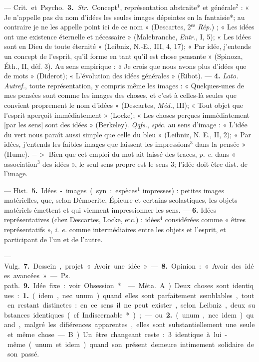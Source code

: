 \begin{itemize}[leftmargin=1cm, label=, itemsep=1pt]
— \si{Crit.} et \si{Psycho.} {\bf 3.} {\it Str.} Concept$^1$, représentation abstraite* et
générale$^2$ : « Je n’appelle pas du nom
d’idées les seules images dépeintes en
la fantaisie*; au contraire je ne les
appelle point ici de ce nom » (Descartes, 2$^\text{es}$ {\it Rép.}) ; « Les idées ont une
existence éternelle et nécessaire »
(Malebranche, {\it Entr.}, I, 5); « Les
idées sont en Dieu de toute éternité » (Leibniz, N.-E., III, 4, 17);
« Par idée, j'entends un concept de
l'esprit, qu'il forme en tant qu'il est
chose pensante » (Spinoza, Éth., II,
déf. 3). Au sens empirique : « Je
crois que nous avons plus d'idées
que de mots » (Diderot); « L’évolution des idées générales » (Ribot). —
 {\bf 4.} {\it Lato.} {\it Autref.}, toute représentation, y compris même les images :
« Quelques-unes de mes pensées
sont comme les images des choses,
et c’est à celles-là seules que convient proprement le nom d'idées »
(Descartes, \si{{\it Méd.}}, III); « Tout objet
que l'esprit aperçoit immédiatement » (Locke); « Les choses perçues
immédiatement [par les sens] sont
des idées » (Berkeley). {\it Qqfs.}, {\it spéc.}
au sens d'image : « L'idée du vert
nous paraît aussi simple que celle du
bleu » (Leibniz, N. E., II, 2); « Par
idées, j'entends les faibles images
que laissent les impressions$^3$ dans
la pensée » (Hume). $->$ Bien que
cet emploi du mot ait laissé des
traces, {\it p. e.} dans « association$^3$ des
idées », le seul sens propre est le
sens 3; l'idée doit être dist. de
l’image.

— \si{Hist.} {\bf 5.} Idées-images (syn. :
espèces$^1$ impresses) : petites images
matérielles, que, selon Démocrite,
Épicure et certains scolastiques, les
objets matériels émettent et qui viennent impressionner les sens. — {\bf 6.}
Idées représentatives (chez Descartes, Locke, etc.) : idées$^4$ considérées comme « êtres représentatifs », {\it i. e.} comme intermédiaires
entre les objets et l’esprit, et participant de l’un et de l’autre.

— \si{Vulg.} {\bf 7.} Dessein, projet
« Avoir une idée ». — {\bf 8.} Opinion :
« Avoir des idées avancées ».

— \si{Ps. path.} {\bf 9.} Idée fixe : voir
Obsession*.

 — \si{Méta.} A) Deux choses
sont identiques : {\bf 1.} (idem, nec unum)
quand elles sont parfaitement semblables, tout en restant distinctes :
en ce sens il ne peut exister, selon
Leibniz, deux substances identiques
(cf. Indiscernable*); — ou {\bf 2.} (unum,
nec idem) quand, malgré les difiérences apparentes, elles sont substantiellement une seule et même
chose. — B) Un être changeant
reste : 3 identique à lui-même
(unum et idem) quand son présent
demeure intimement solidaire de
son passé.


\end{itemize}
